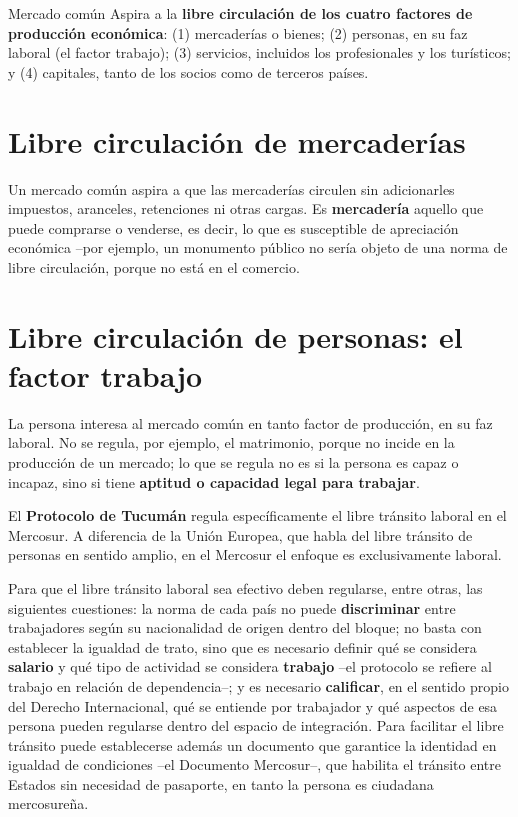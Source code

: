 \documentclass[12pt,oneside]{book}
\begin{document}
\begin{definicion}{Mercado común}
Aspira a la \textbf{libre circulación de los cuatro factores de producción económica}: (1) mercaderías o bienes; (2) personas, en su faz laboral (el factor trabajo); (3) servicios, incluidos los profesionales y los turísticos; y (4) capitales, tanto de los socios como de terceros países.
\end{definicion}

\section{Libre circulación de mercaderías}

Un mercado común aspira a que las mercaderías circulen sin adicionarles impuestos, aranceles, retenciones ni otras cargas. Es \textbf{mercadería} aquello que puede comprarse o venderse, es decir, lo que es susceptible de apreciación económica --por ejemplo, un monumento público no sería objeto de una norma de libre circulación, porque no está en el comercio.

\section{Libre circulación de personas: el factor trabajo}

La persona interesa al mercado común en tanto factor de producción, en su faz laboral. No se regula, por ejemplo, el matrimonio, porque no incide en la producción de un mercado; lo que se regula no es si la persona es capaz o incapaz, sino si tiene \textbf{aptitud o capacidad legal para trabajar}.

\begin{nota}
El \textbf{Protocolo de Tucumán} regula específicamente el libre tránsito laboral en el Mercosur. A diferencia de la Unión Europea, que habla del libre tránsito de personas en sentido amplio, en el Mercosur el enfoque es exclusivamente laboral.
\end{nota}

Para que el libre tránsito laboral sea efectivo deben regularse, entre otras, las siguientes cuestiones: la norma de cada país no puede \textbf{discriminar} entre trabajadores según su nacionalidad de origen dentro del bloque; no basta con establecer la igualdad de trato, sino que es necesario definir qué se considera \textbf{salario} y qué tipo de actividad se considera \textbf{trabajo} --el protocolo se refiere al trabajo en relación de dependencia--; y es necesario \textbf{calificar}, en el sentido propio del Derecho Internacional, qué se entiende por trabajador y qué aspectos de esa persona pueden regularse dentro del espacio de integración. Para facilitar el libre tránsito puede establecerse además un documento que garantice la identidad en igualdad de condiciones --el Documento Mercosur--, que habilita el tránsito entre Estados sin necesidad de pasaporte, en tanto la persona es ciudadana mercosureña.
\end{document}
